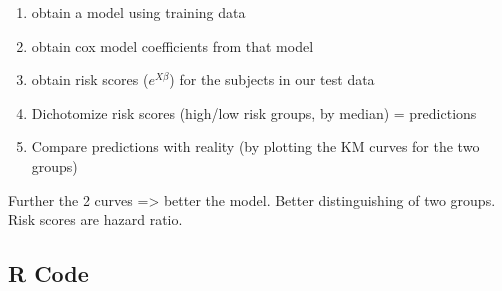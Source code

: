 \documentclass{article}                                                   %
\begin{document}
    \begin{enumerate}
      \item obtain a model using training data
      \item obtain cox model coefficients from that model
      \item obtain risk scores ($e^{X\beta}$) for the subjects in our test data
      \item Dichotomize risk scores (high/low risk groups, by median) = predictions
      \item Compare predictions with reality
            (by plotting the KM curves for the two groups)
    \end{enumerate}

    Further the 2 curves => better the model. Better distinguishing of two groups.\\ \indent
    Risk scores are hazard ratio.\\ \indent

  \subsection{R Code}
    \begin{verbatim}
       
    \end{verbatim}
\end{document}
